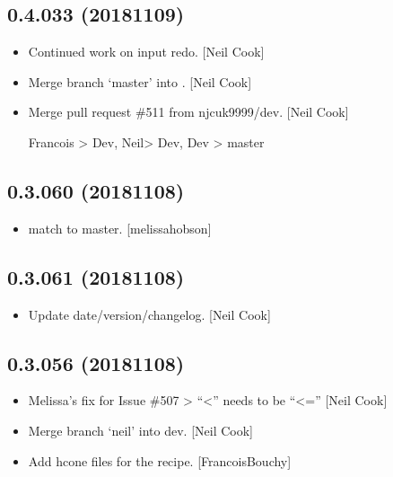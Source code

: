 \documentclass[a4paper,10pt,english]{report}
\begin{document}
\subsection{0.4.033 (2018\sphinxhyphen{}11\sphinxhyphen{}09)}
\label{\detokenize{misc/changelog:id281}}\begin{itemize}
\item {} 
Continued work on input redo. {[}Neil Cook{]}

\item {} 
Merge branch ‘master’ into . {[}Neil Cook{]}

\item {} 
Merge pull request \#511 from njcuk9999/dev. {[}Neil Cook{]}

Francois \textendash{}\textgreater{} Dev, Neil\textendash{}\textgreater{} Dev, Dev \textendash{}\textgreater{} master

\end{itemize}


\subsection{0.3.060 (2018\sphinxhyphen{}11\sphinxhyphen{}08)}
\label{\detokenize{misc/changelog:id282}}\begin{itemize}
\item {} 
 match to master. {[}melissa\sphinxhyphen{}hobson{]}

\end{itemize}


\subsection{0.3.061 (2018\sphinxhyphen{}11\sphinxhyphen{}08)}
\label{\detokenize{misc/changelog:id283}}\begin{itemize}
\item {} 
Update date/version/changelog. {[}Neil Cook{]}

\end{itemize}


\subsection{0.3.056 (2018\sphinxhyphen{}11\sphinxhyphen{}08)}
\label{\detokenize{misc/changelog:id284}}\begin{itemize}
\item {} 
 \sphinxhyphen{} Melissa’s fix for Issue \#507 \sphinxhyphen{}\textgreater{}   “\textless{}” needs to be “\textless{}=”
{[}Neil Cook{]}

\item {} 
Merge branch ‘neil’ into dev. {[}Neil Cook{]}

\item {} 
Add hcone files for the  recipe. {[}FrancoisBouchy{]}

\end{itemize}
\end{document}
